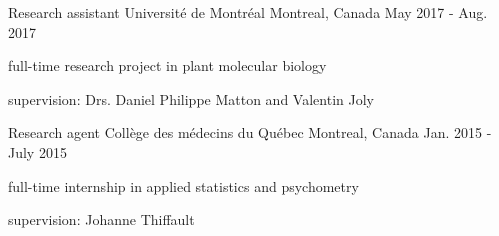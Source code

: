 \begin{cventries}
  \cventry
    {Research assistant} %
    {Université de Montréal} %
    {Montreal, Canada} %
    {May 2017 - Aug. 2017} %
    {
      \begin{cvitems} %
        \item {full-time research project in plant molecular biology}
        \item {supervision: Drs. Daniel Philippe Matton and Valentin Joly}
      \end{cvitems}
    }

  \cventry
    {Research agent} %
    {Collège des médecins du Québec} %
    {Montreal, Canada} %
    {Jan. 2015 - July 2015} %
    {
      \begin{cvitems} %
        \item {full-time internship in applied statistics and psychometry }
        \item {supervision: Johanne Thiffault}
      \end{cvitems}
    }

\end{cventries}





